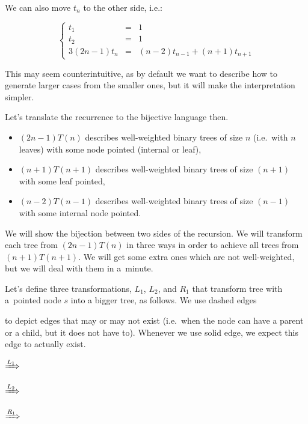 \documentclass[final]{article}
\theoremstyle{definition}
\theoremstyle{definition}
\theoremstyle{remark}
\newcommand{\includeinlinescaledsvg}[3]{\begin{minipage}{#1\textwidth}\begin{center}\end{center}\end{minipage}}
\begin{document}
We can also move \(t_n\) to the other side, i.e.:

\[\left\{\begin{array}{rcl}
            t_1 &=& 1\\
            t_2 &=& 1\\
            3 (2 n - 1) t_n &=& (n - 2) t_{n - 1} + (n + 1) t_{n + 1}
\end{array}\right.\]

This may seem counterintuitive, as by default we want to describe how to generate larger cases from the smaller ones, but it will make the interpretation simpler.

Let's translate the recurrence to the bijective language then.
\begin{itemize}
    \item \((2 n - 1) T(n)\) describes well-weighted binary trees of size \(n\) (i.e.~with \(n\) leaves) with some node pointed (internal or leaf),
    \item \((n + 1) T(n + 1)\) describes well-weighted binary trees of size \((n + 1)\) with some leaf pointed,
    \item \((n - 2) T(n - 1)\) describes well-weighted binary trees of size \((n - 1)\) with some internal node pointed.
\end{itemize}

We will show the bijection between two sides of the recursion. We will transform each tree from \((2 n - 1) T(n)\) in three ways in order to achieve all trees from \((n + 1) T(n + 1)\). We will get some extra ones which are not well-weighted, but we will deal with them in a~minute.

Let's define three transformations, \(L_1\), \(L_2\), and \(R_1\) that transform tree with a~pointed node \(s\) into a bigger tree, as follows. We use dashed edges 
\begin{minipage}{1.5em}

\end{minipage}
to depict edges that may or may not exist (i.e.~when the node can have a parent or a child, but it does not have to). Whenever we use solid edge, we expect this edge to actually exist.

\begin{center}
    \includeinlinescaledsvg{.16}{.5}{schroder__lr_base}%
    \(\xRightarrow{L_1}\)%
    \includeinlinescaledsvg{.16}{.5}{schroder__l1}%
    \hspace{.1\textwidth}%
    \includeinlinescaledsvg{.16}{.5}{schroder__lr_base}%
    \(\xRightarrow{L_2}\)%
    \includeinlinescaledsvg{.16}{.5}{schroder__l2}%

    \includeinlinescaledsvg{.16}{.5}{schroder__lr_base}%
    \(\xRightarrow{R_1}\)%
    \includeinlinescaledsvg{.16}{.5}{schroder__r1}%
\end{center}
\end{document}
